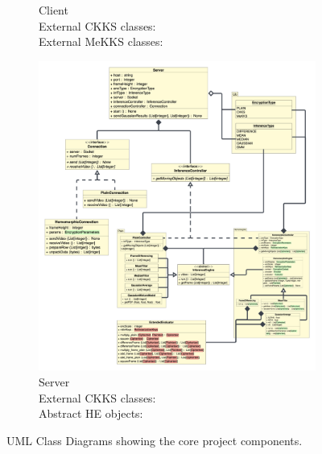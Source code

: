 \begin{figure}[h!]
\begin{subfigure}[b]{0.44\textwidth}
        \caption{Client\medskip\\External CKKS classes: \hl{\quad\quad\quad\quad}\smallskip\\External MeKKS classes: \hl{\quad\quad\quad\quad}}
        \label{fig:clientUML}
    \end{subfigure}
    \hfill
    \begin{subfigure}[b]{0.55\textwidth}
        \centering
        \includegraphics[scale=0.15]{figures/serverClasses}
        \captionsetup{justification=centering}
        \caption{Server\medskip\\External CKKS classes: \hl{\quad\quad\quad\quad}\smallskip\\Abstract HE objects: \hl{\quad\quad\quad\quad}}
        \label{fig:serverUML}
    \end{subfigure}
    \caption[UML Class Diagrams for Core Components]{UML Class Diagrams showing the core project components.}
\end{figure}
